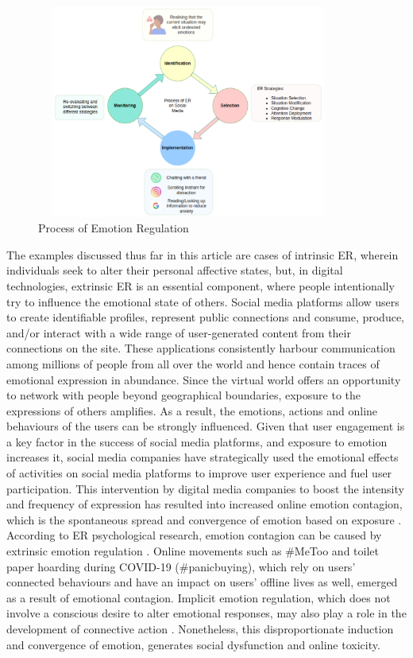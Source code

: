 \documentclass[lettersize,journal]{IEEEtran}
\begin{document}
\begin{figure}[h]
  
    \centering
    \includegraphics[width=10cm,height=7cm,keepaspectratio]{ERProcess.pdf}
  \caption{Process of Emotion Regulation}
  \label{fig:Process}
  \end{figure}
  
  
The examples discussed thus far in this article are cases of intrinsic ER, wherein individuals seek to alter their personal affective states, but, in digital technologies, extrinsic ER is an essential component, where people intentionally try to influence the emotional state of others. Social media platforms allow users to create identifiable profiles, represent public connections and consume, produce, and/or interact with a wide range of user-generated content from their connections on the site. These applications consistently harbour communication among millions of people from all over the world and hence contain traces of emotional expression in abundance. Since the virtual world offers an opportunity to network with people beyond geographical boundaries, exposure to the expressions of others amplifies. As a result, the emotions, actions and online behaviours of the users can be strongly influenced. Given that user engagement is a key factor in the success of social media platforms, and exposure to emotion increases it, social media companies have strategically used the emotional effects of activities on social media platforms to improve user experience and fuel user participation. This intervention by digital media companies to boost the intensity and frequency of expression has resulted into increased online emotion contagion, which is the spontaneous spread and convergence of emotion based on exposure \cite{goldenberg2020digital}. According to ER psychological research, emotion contagion can be caused by extrinsic emotion regulation \cite{elfenbein2014many}. Online movements such as \#MeToo and toilet paper hoarding during COVID-19 (\#panicbuying), which rely on users' connected behaviours and have an impact on users' offline lives as well, emerged as a result of emotional contagion. Implicit emotion regulation, which does not involve a conscious desire to alter emotional responses, may also play a role in the development of connective action \cite{mirbabaie2021development}. Nonetheless, this disproportionate induction and convergence of emotion, generates social dysfunction and online toxicity.
\end{document}
